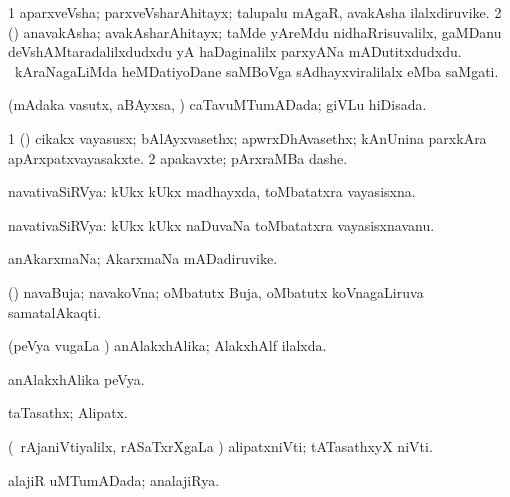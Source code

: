 \bentry
{}
\gl{\nA}
\bmng
\bnum
\num{1} aparxveVsha; parxveVsharAhitayx; talupalu mAgaR, avakAsha ilalxdiruvike. 
\num{2} (\nAyxshA) anavakAsha; avakAsharAhitayx; taMde yAreMdu nidhaRrisuvalilx, gaMDanu deVshAMtaradalilxdudxdu yA haDaginalilx parxyANa mADutitxdudxdu. \mo\ kAraNagaLiMda heMDatiyoDane saMBoVga sAdhayxviralilalx eMba saMgati. 
\enum
\emng
\eentry

\bentry
{}
\gl{\gu}
\bmng
(mAdaka vasutx, aBAyxsa, \mo) caTavuMTumADada; giVLu hiDisada. 
\emng
\eentry

\bentry
{}
\gl{\nA}
\bmng
\bnum
\num{1} (\ca) cikakx vayasusx; bAlAyxvasethx; apwrxDhAvasethx; kAnUnina parxkAra apArxpatxvayasakxte. 
\num{2} apakavxte; pArxraMBa dashe. 
\enum
\emng
\eentry

\bentry
{}
\gl{\nA}
\bmng
navativaSiRVya: kUkx kUkx madhayxda, toMbatatxra vayasisxna. 
\emng
\eentry

\bentry
{}
\gl{\nA}
\bmng
navativaSiRVya: kUkx kUkx naDuvaNa toMbatatxra vayasisxnavanu. 
\emng
\eentry

\bentry
{}
\gl{\nA}
\bmng
anAkarxmaNa; AkarxmaNa mADadiruvike. 
\emng
\eentry

\bentry
{}
\gl{\nA}
\bmng
(\ga) navaBuja; navakoVna; oMbatutx Buja, oMbatutx koVnagaLiruva samatalAkaqti.  
\emng
\eentry

\bentry
{}
\gl{\gu}
\bmng
(peVya \mo vugaLa \vi) anAlakxhAlika; AlakxhAlf ilalxda. 
\emng
\eentry

\bentry
{}
\gl{\nA}
\bmng
anAlakxhAlika peVya. 
\emng
\eentry

\bentry
{}
\gl{\gu}
\bmng
taTasathx; Alipatx. 
\emng
\eentry

\bentry
{}
\gl{\nA}
\bmng
(\kanmu\ rAjaniVtiyalilx, rASaTxrXgaLa \vi) alipatxniVti; tATasathxyX niVti. 
\emng
\eentry 

\bentry
{}
\gl{\gu}
\bmng
alajiR uMTumADada; analajiRya. 
\emng
\eentry

